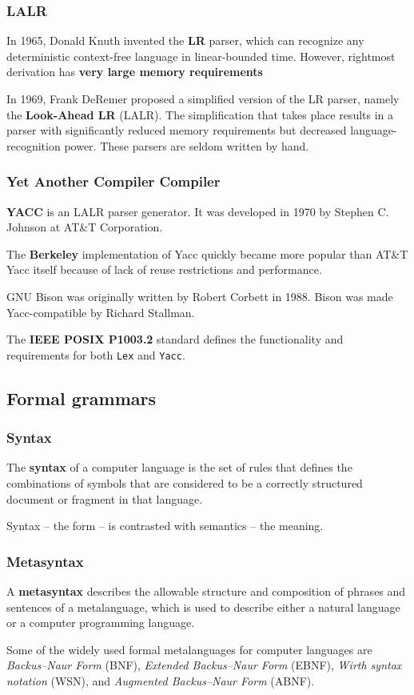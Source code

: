 \documentclass{beamer}
\begin{document}
\begin{frame}
  \frametitle{LALR}
  In 1965, Donald Knuth invented the \textbf{LR} parser, which can recognize any
  deterministic context-free language in linear-bounded time. However, rightmost
  derivation has \textbf{very large memory requirements}

  \vfill

  In 1969, Frank DeRemer proposed a simplified version of the LR parser, namely
  the \textbf{Look-Ahead LR} (LALR). The simplification that takes place results
  in a parser with significantly reduced memory requirements but decreased
  language-recognition power. These parsers are seldom written by hand.
\end{frame}

\begin{frame}
  \frametitle{Yet Another Compiler Compiler}
  \textbf{YACC} is an LALR parser generator. It was developed in 1970 by Stephen C.
  Johnson at AT\&T Corporation.

  \vfill

  The \textbf{Berkeley} implementation of Yacc quickly became more popular than
  AT\&T Yacc itself because of lack of reuse restrictions and performance.

  \vfill

  GNU Bison was originally written by Robert Corbett in 1988. Bison was made
  Yacc-compatible by Richard Stallman.

  \vfill

  The \textbf{IEEE POSIX P1003.2} standard defines the functionality and requirements for
  both \texttt{Lex} and \texttt{Yacc}.
\end{frame}

\subsection{Formal grammars}

\begin{frame}
  \frametitle{Syntax}
  The \textbf{syntax} of a computer language is the set of rules that defines
  the combinations of symbols that are considered to be a correctly structured
  document or fragment in that language.

  \vfill

  Syntax – the form – is contrasted with semantics – the meaning.
\end{frame}

\begin{frame}
  \frametitle{Metasyntax}
  A \textbf{metasyntax} describes the allowable structure and composition of
  phrases and sentences of a metalanguage, which is used to describe either a
  natural language or a computer programming language.

  \vfill
  Some of the widely used formal metalanguages for computer languages are
  \textit{Backus–Naur Form} (BNF),
  \textit{Extended Backus–Naur Form} (EBNF), \textit{Wirth syntax notation}
  (WSN), and \textit{Augmented Backus–Naur Form} (ABNF).
\end{frame}
\end{document}
